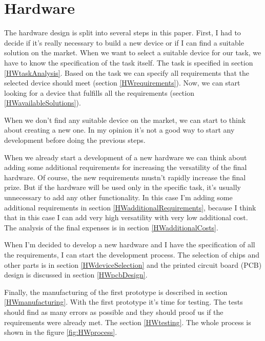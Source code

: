 \chapter{Hardware}
The hardware design is split into several steps in this paper. First, I had to decide if it's really necessary to build a new device or if I can find a suitable solution on the market. When we want to select a suitable device for our task, we have to know the specification of the task itself. The task is specified in section \ref{HWtaskAnalysis}. Based on the task we can specify all requirements that the selected device should meet (section \ref{HWrequirements}). Now, we can start looking for a device that fulfills all the requirements (section \ref{HWavailableSolutions}).

When we don't find any suitable device on the market, we can start to think about creating a new one. In my opinion it's not a good way to start any development before doing the previous steps.

When we already start a development of a new hardware we can think about adding some additional requirements for increasing the versatility of the final hardware. Of course, the new requirements mustn't rapidly increase the final prize. But if the hardware will be used only in the specific task, it's usually unnecessary to add any other functionality. In this case I'm adding some additional requirements in section \ref{HWadditionalRequirements}, because I think that in this case I can add very high versatility with very low additional cost. The analysis of the final expenses is in section \ref{HWadditionalCosts}.

When I'm decided to develop a new hardware and I have the specification of all the requirements, I can start the development process. The selection of chips and other parts is in section \ref{HWdeviceSelection} and the printed circuit board (PCB) design is discussed in section \ref{HWpcbDesign}.

Finally, the manufacturing of the first prototype is described in section \ref{HWmanufacturing}. With the first prototype it's time for testing. The tests should find as many errors as possible and they should proof us if the requirements were already met. The section \ref{HWtesting}. The whole process is shown in the figure \ref{fig:HWprocess}.

